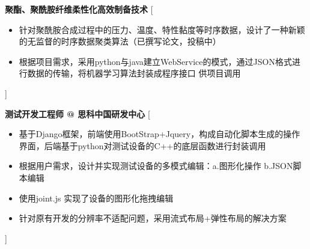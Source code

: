 \documentclass[zh]{resume}
\begin{document}

\begin{experiences}
    {\textbf{ 聚酯、聚酰胺纤维柔性化高效制备技术}}%
    [\begin{itemize}
      \item 针对聚酰胺合成过程中的压力、温度、特性黏度等时序数据，设计了一种新颖的无监督的时序数据聚类算法（已撰写论文，投稿中）
      \item 根据项目需求，采用python与java建立WebService的模式，通过JSON格式进行数据的传输，将机器学习算法封装成程序接口 供项目调用
    \end{itemize}] 
\end{experiences}

\begin{experiences}
    {\textbf{测试开发工程师 @ 思科中国研发中心}}%
    [\begin{itemize}
      \item 基于Django框架，前端使用BootStrap+Jquery，构成自动化脚本生成的操作界面，后端基于python对测试设备的C++的底层函数进行封装调用
      \item 根据用户需求，设计并实现测试设备的多模式编辑：a.图形化操作 b.JSON脚本编辑
      \item 使用joint.js 实现了设备的图形化拖拽编辑
      \item 针对原有开发的分辨率不适配问题，采用流式布局+弹性布局的解决方案
    \end{itemize}] 
\end{experiences}
\end{document}
